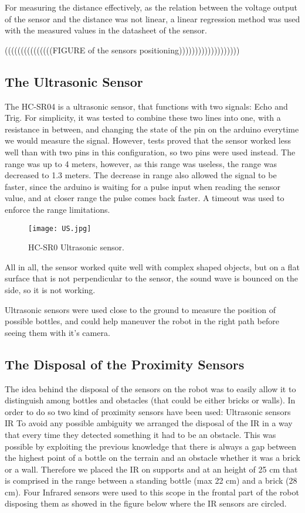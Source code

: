For measuring the distance effectively, as the relation between the voltage output of the sensor and the distance was not linear, a linear regression method was used with the measured values in the datasheet of the sensor.

(((((((((((((((FIGURE of the sensors positioning)))))))))))))))))))

\subsection{The Ultrasonic Sensor}

The HC-SR04 is a ultrasonic sensor, that functions with two signals: Echo and Trig. For simplicity, it was tested to combine these two lines into one, with a resistance in between, and changing the state of the pin on the arduino everytime we would measure the signal. However, tests proved that the sensor worked less well than with two pins in this configuration, so two pins were used instead. The range was up to 4 meters, however, as this range was useless, the range was decreased to 1.3 meters. The decrease in range also allowed the signal to be faster, since the arduino is waiting for a pulse input when reading the sensor value, and at closer range the pulse comes back faster. A timeout was used to enforce the range limitations. 

\begin{figure}[H]
  \centering
  \texttt{[image: US.jpg]}
  \caption{HC-SR0 Ultrasonic sensor.}
\label{fig:US}
\end{figure}

All in all, the sensor worked quite well with complex shaped objects, but on a flat surface that is not perpendicular to the sensor, the sound wave is bounced on the side, so it is not working.

Ultrasonic sensors were used close to the ground to measure the position of possible bottles, and could help maneuver the robot in the right path before seeing them with it's camera.

\subsection{The Disposal of the Proximity Sensors}
The idea behind the disposal of the sensors on the robot was to easily allow it to distinguish among bottles and obstacles (that could be either bricks or walls). In order to do so two kind of proximity sensors have been used:
Ultrasonic sensors 
IR
To avoid any possible ambiguity we arranged the disposal of the IR in a way that every time they detected something it had to be an obstacle.
This was possible by exploiting the previous knowledge that there is always a gap between the highest point of a bottle on the terrain and an obstacle whether it was a brick or a wall.
Therefore we placed the IR on supports and at an height of 25 cm that is comprised in the range between a standing bottle (max 22 cm) and a brick (28 cm).
Four Infrared sensors were used to this scope in the frontal part of the robot disposing them as showed in the figure below where the IR sensors are circled.






